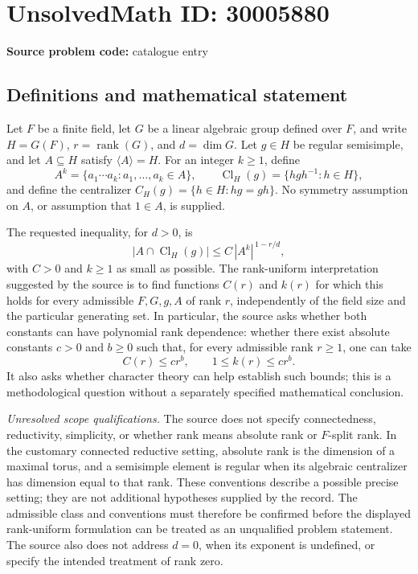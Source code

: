 \documentclass[11pt]{article}
\begin{document}
\section*{UnsolvedMath ID: 30005880}
\textbf{Source problem code:} catalogue entry
\subsection{Definitions and mathematical statement}
Let \(F\) be a finite field, let \(G\) be a linear algebraic group defined over \(F\), and write \(H=G(F)\), \(r=\operatorname{rank}(G)\), and \(d=\dim G\). Let \(g\in H\) be regular semisimple, and let \(A\subseteq H\) satisfy \(\langle A\rangle=H\). For an integer \(k\geq 1\), define
\[
A^k=\{a_1\cdots a_k:a_1,\ldots,a_k\in A\},\qquad
\operatorname{Cl}_H(g)=\{hgh^{-1}:h\in H\},
\]
and define the centralizer \(C_H(g)=\{h\in H:hg=gh\}\). No symmetry assumption on \(A\), or assumption that \(1\in A\), is supplied.

The requested inequality, for \(d>0\), is
\[
\bigl|A\cap\operatorname{Cl}_H(g)\bigr|
\leq C\,|A^k|^{\,1-r/d},
\]
with \(C>0\) and \(k\geq 1\) as small as possible. The rank-uniform interpretation suggested by the source is to find functions \(C(r)\) and \(k(r)\) for which this holds for every admissible \(F,G,g,A\) of rank \(r\), independently of the field size and the particular generating set. In particular, the source asks whether both constants can have polynomial rank dependence: whether there exist absolute constants \(c>0\) and \(b\geq 0\) such that, for every admissible rank \(r\geq 1\), one can take
\[
C(r)\leq c r^b,\qquad 1\leq k(r)\leq c r^b.
\]
It also asks whether character theory can help establish such bounds; this is a methodological question without a separately specified mathematical conclusion.

\emph{Unresolved scope qualifications.} The source does not specify connectedness, reductivity, simplicity, or whether rank means absolute rank or \(F\)-split rank. In the customary connected reductive setting, absolute rank is the dimension of a maximal torus, and a semisimple element is regular when its algebraic centralizer has dimension equal to that rank. These conventions describe a possible precise setting; they are not additional hypotheses supplied by the record. The admissible class and conventions must therefore be confirmed before the displayed rank-uniform formulation can be treated as an unqualified problem statement. The source also does not address \(d=0\), when its exponent is undefined, or specify the intended treatment of rank zero.
\end{document}
